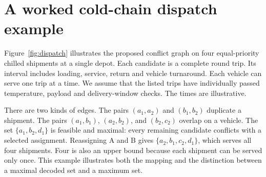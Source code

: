 \section{A worked cold-chain dispatch example}
\label{app:dispatch}
Figure~\ref{fig:dispatch} illustrates the proposed conflict graph on four equal-priority chilled shipments at a single depot. Each candidate is a complete round trip. Its interval includes loading, service, return and vehicle turnaround. Each vehicle can serve one trip at a time. We assume that the listed trips have individually passed temperature, payload and delivery-window checks. The times are illustrative.


There are two kinds of edges. The pairs \((a_1,a_2)\) and \((b_1,b_2)\) duplicate a shipment. The pairs \((a_1,b_1)\), \((a_2,b_2)\), and \((b_2,c_2)\) overlap on a vehicle. The set \(\{a_1,b_2,d_1\}\) is feasible and maximal: every remaining candidate conflicts with a selected assignment. Reassigning A and B gives \(\{a_2,b_1,c_2,d_1\}\), which serves all four shipments. Four is also an upper bound because each shipment can be served only once. This example illustrates both the mapping and the distinction between a maximal decoded set and a maximum set.


